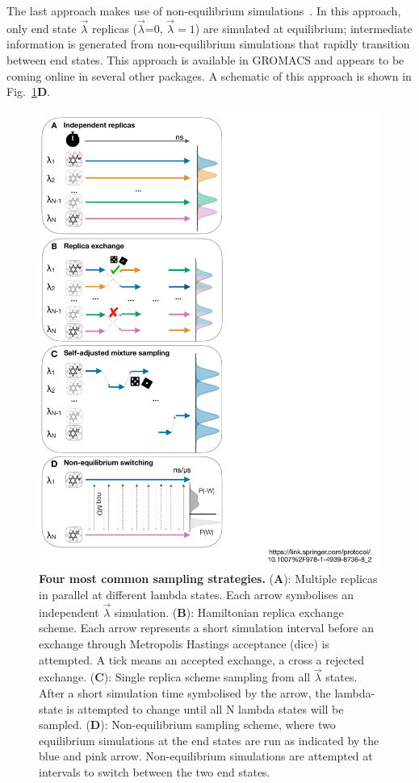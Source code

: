 \documentclass[9pt,bestpractices,pubversion]{livecoms}
\begin{document}
The last approach makes use of non-equilibrium simulations~\cite{aldeghi2018accurate}. In this approach, only end state $\vec{\lambda}$ replicas ($\vec{\lambda}$=0, $\vec{\lambda}=1$) are simulated at equilibrium; intermediate information is generated from non-equilibrium simulations that rapidly transition between end states. This approach is available in GROMACS and appears to be coming online in several other packages. A schematic of this approach is shown in Fig.~\ref{fig:fig_sampling_scheme}\textbf{D}. 

\begin{figure}
    \includegraphics[width=0.88\columnwidth]{figures/fig8_sampl_scheme/Figure.pdf}
    \caption{\textbf{Four most common sampling strategies.} (\textbf{A}): Multiple replicas in parallel at different lambda states. Each arrow symbolises an independent $\vec{\lambda}$ simulation. (\textbf{B}): Hamiltonian replica exchange scheme. Each arrow represents a short simulation interval before an exchange through Metropolis Hastings acceptance (dice) is attempted. A tick means an accepted exchange, a cross a rejected exchange. (\textbf{C}): Single replica scheme sampling from all $\vec{\lambda}$ states. After a short simulation time symbolised by the arrow, the lambda-state is attempted to change until all N lambda states will be sampled. (\textbf{D}): Non-equilibrium sampling scheme, where two equilibrium simulations at the end states are run as indicated by the blue and pink arrow. Non-equilibrium simulations are attempted at intervals to switch between the two end states.}
    \label{fig:fig_sampling_scheme}
\end{figure} 
\end{document}

